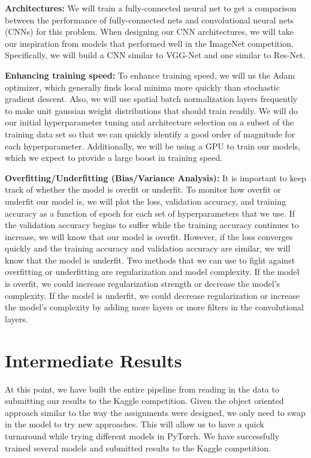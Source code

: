 \documentclass[10pt,twocolumn,letterpaper]{article}
\begin{document}
\textbf{Architectures:} We will train a fully-connected neural net to get a comparison between the performance of fully-connected nets and convolutional neural nets (CNNs) for this problem. When designing our CNN architectures, we will take our inspiration from models that performed well in the ImageNet competition. Specifically, we will build a CNN similar to VGG-Net\cite{VGGNet} and one similar to Res-Net\cite{ResNet}.

\textbf{Enhancing training speed:} To enhance training speed, we will us the Adam optimizer\cite{Adam}, which generally finds local minima more quickly than stochastic gradient descent. Also, we will use spatial batch normalization layers frequently to make unit gaussian weight distributions that should train readily. We will do our initial hyperparameter tuning and architecture selection on a subset of the training data set so that we can quickly identify a good order of magnitude for each hyperparameter. Additionally, we will be using a GPU to train our models, which we expect to provide a large boost in training speed.

\textbf{Overfitting/Underfitting (Bias/Variance Analysis):} It is important to keep track of whether the model is overfit or underfit. To monitor how overfit or underfit our model is, we will plot the loss, validation accuracy, and training accuracy as a function of epoch for each set of hyperparameters that we use. If the validation accuracy begins to suffer while the training accuracy continues to increase, we will know that our model is overfit. However, if the loss converges quickly and the training accuracy and validation accuracy are similar, we will know that the model is underfit. Two methods that we can use to fight against overfitting or underfitting are regularization and model complexity. If the model is overfit, we could increase regularization strength or decrease the model's complexity. If the model is underfit, we could decrease regularization or increase the model's complexity by adding more layers or more filters in the convolutional layers.




\section{Intermediate Results}

At this point, we have built the entire pipeline from reading in the data to submitting our results to the Kaggle competition. Given the object oriented approach similar to the way the assignments were designed, we only need to swap in the model to try new approaches. This will allow us to have a quick turnaround while trying different models in PyTorch. We have successfully trained several models and submitted results to the Kaggle competition.
\end{document}
